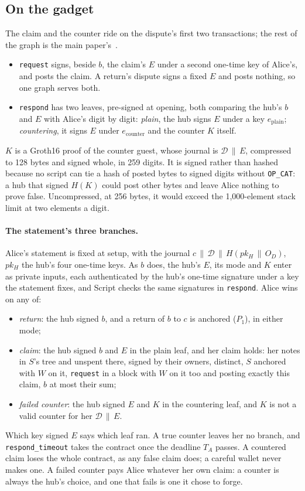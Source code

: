\documentclass[11pt]{article}
\newcommand{\tx}[1]{\texttt{#1}}
\begin{document}
\subsection{On the gadget}

The claim and the counter ride on the dispute's first two transactions;
the rest of the graph is the main paper's~\cite{lichenbabe}.
\begin{itemize}[leftmargin=1.5em]
\item \tx{request} signs, beside $b$, the claim's $E$ under a second
  one-time key of Alice's, and posts the claim. A return's dispute signs
  a fixed $E$ and posts nothing, so one graph serves both.
\item \tx{respond} has two leaves, pre-signed at opening, both comparing
  the hub's $b$ and $E$ with Alice's digit by digit: \emph{plain}, the
  hub signs $E$ under a key $e_{\mathrm{plain}}$; \emph{countering}, it
  signs $E$ under $e_{\mathrm{counter}}$ and the counter $K$ itself.
\end{itemize}
$K$ is a Groth16 proof of the counter guest, whose journal is
$\mathcal{D} \,\|\, E$, compressed to 128 bytes and signed whole, in 259
digits. It is signed rather than hashed because no script can tie a
hash of posted bytes to signed digits without \tx{OP\_CAT}: a hub that
signed $H(K)$ could post other bytes and leave Alice nothing to prove
false. Uncompressed, at 256 bytes, it would exceed the 1,000-element
stack limit at two elements a digit.

\paragraph{The statement's three branches.} Alice's statement is fixed
at setup, with the journal $c \,\|\, \mathcal{D} \,\|\, H(pk_H \,\|\, O_D)$,
$pk_H$ the hub's four one-time keys. As $b$ does, the hub's $E$, its
mode and $K$ enter as private inputs, each authenticated by the hub's
one-time signature under a key the statement fixes, and Script checks
the same signatures in \tx{respond}. Alice wins on any of:
\begin{itemize}[leftmargin=1.5em]
\item \emph{return}: the hub signed $b$, and a return of $b$ to $c$ is
  anchored ($P_1$), in either mode;
\item \emph{claim}: the hub signed $b$ and $E$ in the plain leaf, and her
  claim holds: her notes in $S$'s tree and unspent there, signed by
  their owners, distinct, $S$ anchored with $W$ on it, \tx{request} in a
  block with $W$ on it too and posting exactly this claim, $b$ at most
  their sum;
\item \emph{failed counter}: the hub signed $E$ and $K$ in the
  countering leaf, and $K$ is not a valid counter for her
  $\mathcal{D} \,\|\, E$.
\end{itemize}
Which key signed $E$ says which leaf ran. A true counter leaves her no
branch, and \tx{respond\_\allowbreak timeout} takes the contract once the deadline
$T_A$ passes. A countered claim loses the whole contract, as any false
claim does; a careful wallet never makes one. A failed counter pays
Alice whatever her own claim: a counter is always the hub's choice, and
one that fails is one it chose to forge.
\end{document}
